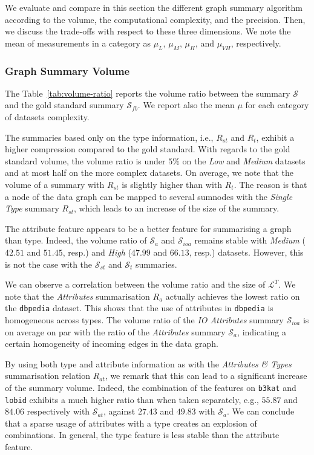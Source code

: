 We evaluate and compare in this section the different graph summary algorithm according to the volume, the computational complexity, and the precision. Then, we discuss the trade-offs with respect to these three dimensions.
We note the mean of measurements in a category as $\mu_{L}$, $\mu_{M}$, $\mu_{H}$, and $\mu_{VH}$, respectively.

\subsubsection{Graph Summary Volume}

The Table~\ref{tab:volume-ratio} reports the volume ratio between the summary $\mathcal{S}$ and the gold standard summary $\mathcal{S}_{fb}$. We report also the mean $\mu$ for each category of datasets complexity.

The summaries based only on the type information, i.e., $R_{st}$ and $R_t$, exhibit a higher compression compared to the gold standard. With regards to the gold standard volume, the volume ratio is under $5\%$ on the \emph{Low} and \emph{Medium} datasets and at most half on the more complex datasets. On average, we note that the volume of a summary with $R_{st}$ is slightly higher than with $R_t$. The reason is that a node of the data graph can be mapped to several sumnodes with the \emph{Single Type} summary $R_{st}$, which leads to an increase of the size of the summary.

The attribute feature appears to be a better feature for summarising a graph than type. Indeed, the volume ratio of $\mathcal{S}_a$ and $\mathcal{S}_{ioa}$ remains stable with \emph{Medium} ($42.51$ and $51.45$, resp.) and \emph{High} ($47.99$ and $66.13$, resp.) datasets. However, this is not the case with the $\mathcal{S}_{st}$ and $\mathcal{S}_t$ summaries. 

We can observe a correlation between the volume ratio and the size of $\mathcal{L}^T$.
We note that the \emph{Attributes} summarisation $R_a$ actually achieves the lowest ratio on the \texttt{dbpedia} dataset. This shows that the use of attributes in \texttt{dbpedia} is homogeneous across types. The volume ratio of the \emph{IO Attributes} summary $\mathcal{S}_{ioa}$ is on average on par with the ratio of the \emph{Attributes} summary $\mathcal{S}_a$, indicating a certain homogeneity of incoming edges in the data graph.

By using both type and attribute information as with the \emph{Attributes \& Types} summarisation relation $R_{at}$, we remark that this can lead to a significant increase of the summary volume. Indeed, the combination of the features on \texttt{b3kat} and \texttt{lobid} exhibits a much higher ratio than when taken separately, e.g., $55.87$ and $84.06$ respectively with $\mathcal{S}_{at}$, against $27.43$ and $49.83$ with $\mathcal{S}_a$. We can conclude that a sparse usage of attributes with a type creates an explosion of combinations. In general, the type feature is less stable than the attribute feature.

